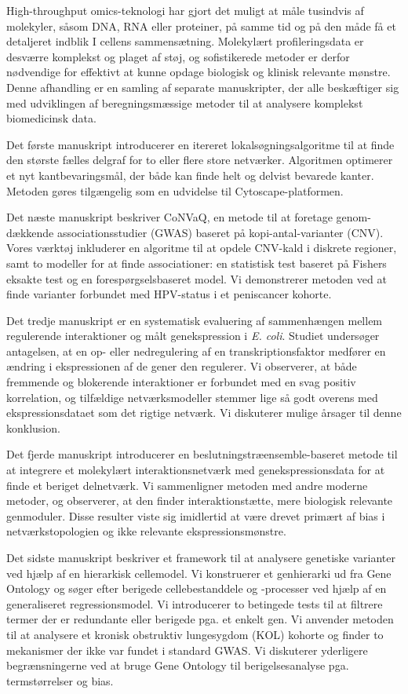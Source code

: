 High-throughput omics-teknologi har gjort det muligt at måle tusindvis af molekyler, såsom DNA, RNA eller proteiner, på samme tid og på den måde få et detaljeret indblik I cellens sammensætning. Molekylært profileringsdata er desværre komplekst og plaget af støj, og sofistikerede metoder er derfor nødvendige for effektivt at kunne opdage biologisk og klinisk relevante mønstre. Denne afhandling er en samling af separate manuskripter, der alle beskæftiger sig med udviklingen af beregningsmæssige metoder til at analysere komplekst biomedicinsk data.

Det første manuskript introducerer en itereret lokalsøgningsalgoritme til at finde den største fælles delgraf for to eller flere store netværker. Algoritmen optimerer et nyt kantbevaringsmål, der både kan finde helt og delvist bevarede kanter. Metoden gøres tilgængelig som en udvidelse til Cytoscape-platformen.

Det næste manuskript beskriver CoNVaQ, en metode til at foretage genom-dækkende associationsstudier (GWAS) baseret på kopi-antal-varianter (CNV). Vores værktøj inkluderer en algoritme til at opdele CNV-kald i diskrete regioner, samt to modeller for at finde associationer: en statistisk test baseret på Fishers eksakte test og en forespørgselsbaseret model. Vi demonstrerer metoden ved at finde varianter forbundet med HPV-status i et peniscancer kohorte.

Det tredje manuskript er en systematisk evaluering af sammenhængen mellem regulerende interaktioner og målt genekspression i \emph{E. coli}. Studiet undersøger antagelsen, at en op- eller nedregulering af en transkriptionsfaktor medfører en ændring i ekspressionen af de gener den regulerer. Vi observerer, at både fremmende og blokerende interaktioner er forbundet med en svag positiv korrelation, og tilfældige netværksmodeller stemmer lige så godt overens med ekspressionsdataet som det rigtige netværk. Vi diskuterer mulige årsager til denne konklusion.

Det fjerde manuskript introducerer en beslutningstræensemble-baseret metode til at integrere et molekylært interaktionsnetværk med genekspressionsdata for at finde et beriget delnetværk. Vi sammenligner metoden med andre moderne metoder, og observerer, at den finder interaktionstætte, mere biologisk relevante genmoduler. Disse resulter viste sig imidlertid at være drevet primært af bias i netværkstopologien og ikke relevante ekspressionsmønstre.

Det sidste manuskript beskriver et framework til at analysere genetiske varianter ved hjælp af en hierarkisk cellemodel. Vi konstruerer et genhierarki ud fra Gene Ontology og søger efter berigede cellebestanddele og -processer ved hjælp af en generaliseret regressionsmodel. Vi introducerer to betingede tests til at filtrere termer der er redundante eller berigede pga. et enkelt gen. Vi anvender metoden til at analysere et kronisk obstruktiv lungesygdom (KOL) kohorte og finder to mekanismer der ikke var fundet i standard GWAS. Vi diskuterer yderligere begrænsningerne ved at bruge Gene Ontology til berigelsesanalyse pga. termstørrelser og bias.

